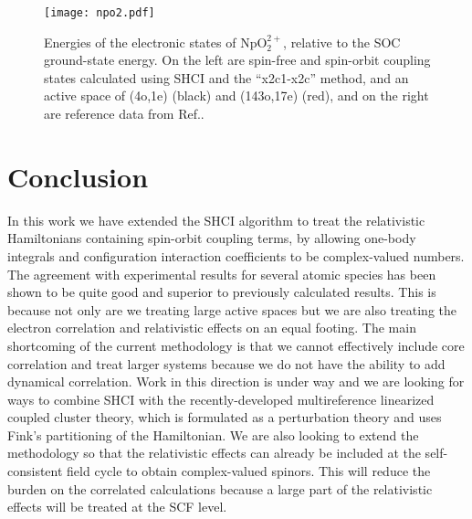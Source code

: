 \documentclass[10pt,aps,prb,twocolumn,amsmath,amssymb,superscriptaddress]{revtex4-1}
\begin{document}

\begin{figure}[htbp!]
	\centering
	\caption{\label{fig:npo22p}
    Energies of the electronic states of NpO$_2^{2+}$, relative to the SOC ground-state energy. On the left are spin-free and spin-orbit coupling states calculated using SHCI and the ``x2c1-x2c'' method, and an active space of (4o,1e) (black) and (143o,17e) (red), and on the right are reference data from Ref..
}
	\texttt{[image: npo2.pdf]}
\end{figure}


\section{Conclusion}
In this work we have extended the SHCI algorithm to treat the relativistic Hamiltonians containing spin-orbit coupling terms, by allowing one-body integrals and configuration interaction coefficients to be complex-valued numbers. The agreement with experimental results for several atomic species has been shown to be quite good and superior to previously calculated results. This is because not only are we treating large active spaces but we are also treating the electron correlation and
relativistic effects on an equal footing. The main shortcoming of the current methodology is that we cannot effectively include core correlation and treat larger systems because we do not have the ability to add dynamical correlation. Work in this direction is under way and we are looking for ways to combine SHCI with the recently-developed multireference linearized coupled cluster theory\cite{sharma2015multireference,Sharma2016b,Sharma2016}, which is formulated as a perturbation theory and uses Fink's partitioning\cite{Fink2006, Fink2009} of the Hamiltonian. We are also looking to extend the methodology so that the relativistic effects can already be included at the self-consistent field cycle to obtain complex-valued spinors. This will reduce the burden on the correlated calculations because a large part of the relativistic effects will be treated at the SCF level.
 
\end{document}
